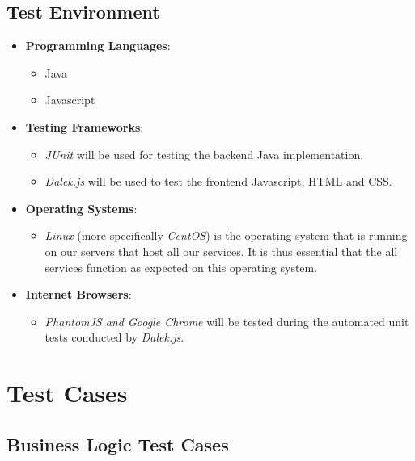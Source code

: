 \documentclass[hidelinks,english]{article}
\begin{document}
		\subsection{Test Environment}
		\begin{itemize}
			\item \textbf{Programming Languages}:
				\begin{itemize}
					\item Java
					\item Javascript
				\end{itemize}
			\item \textbf{Testing Frameworks}:
				\begin{itemize}
					\item \emph{JUnit} will be used for testing the backend Java implementation.
					\item \emph{Dalek.js} will be used to test the frontend Javascript, HTML and CSS.
				\end{itemize}
			\item \textbf{Operating Systems}:
				\begin{itemize}
					\item \emph{Linux} (more specifically \emph{CentOS}) is the operating system that is running on our servers that host all our services. It is thus essential that the all services function as expected on this operating system.
				\end{itemize}
				\item \textbf{Internet Browsers}:
				\begin{itemize}
					\item \emph{PhantomJS and Google Chrome} will be tested during the automated unit tests conducted by \emph{Dalek.js}.
				\end{itemize}
		\end{itemize}
		
%
%
%
%
	\section{Test Cases}
		\subsection{Business Logic Test Cases}
\end{document}
